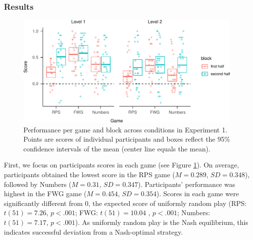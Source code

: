 \documentclass[
  english,
  man,floatsintext]{apa6}
\begin{document}
\hypertarget{results}{%
\subsubsection{Results}\label{results}}

\begin{figure}

{\centering \includegraphics{paper_draft_2021_files/figure-latex/exp1-avg-scores-game-1} 

}

\caption{Performance per game and block across conditions in Experiment 1. Points are scores of individual participants and boxes reflect the 95\% confidence intervals of the mean (center line equals the mean).}\label{fig:exp1-avg-scores-game}
\end{figure}

First, we focus on participants scores in each game (see Figure \ref{fig:exp1-avg-scores-game}). On average, participants obtained the lowest score in the RPS game (\(M = 0.289\), \(SD = 0.348\)), followed by Numbers (\(M = 0.31\), \(SD = 0.347\)). Participants' performance was highest in the FWG game (\(M = 0.454\), \(SD = 0.354\)). Scores in each game were significantly different from 0, the expected score of uniformly random play (RPS: \(t(51) = 7.26\), \(p < .001\); FWG: \(t(51) = 10.04\) , \(p < .001\); Numbers: \(t(51) = 7.17\), \(p < .001\)). As uniformly random play is the Nash equilibrium, this indicates successful deviation from a Nash-optimal strategy.
\end{document}
